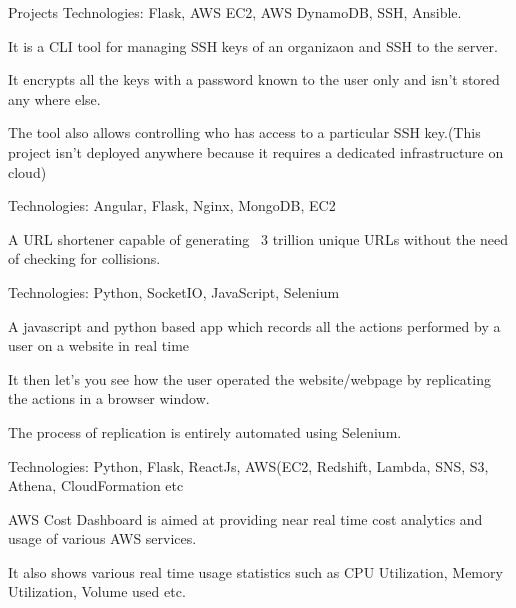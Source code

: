 \documentclass[]{resume-knyte}
\begin{document}
\begin{topic}{Projects}
    {Technologies: Flask, AWS EC2, AWS DynamoDB, SSH, Ansible.}
    {\begin{tightitemize}
        \item It is a CLI tool for managing SSH keys of an organizaon and SSH to the server.
        \item It encrypts all the keys with a password known to the user only and isn’t stored any where else.
        \item The tool also allows controlling who has access to a particular SSH key.(This project isn't deployed anywhere because it requires a dedicated infrastructure on cloud)
    \end{tightitemize}}
    {Technologies: Angular, Flask, Nginx, MongoDB, EC2}
    {\begin{tightitemize}
        \item A URL shortener capable of generating ~3 trillion unique URLs without the need of checking for collisions.
    \end{tightitemize}}
    {Technologies: Python, SocketIO, JavaScript, Selenium}
    {\begin{tightitemize}
        \item A javascript and python based app which records all the actions performed by a user on a website in real time \item It then let’s you see how the user operated the website/webpage by replicating the actions in a browser window.
        \item The process of replication is entirely automated using Selenium.
    \end{tightitemize}}
    {Technologies: Python, Flask, ReactJs, AWS(EC2, Redshift, Lambda, SNS, S3, Athena, CloudFormation etc}
    {\begin{tightitemize}
        \item AWS Cost Dashboard is aimed at providing near real time cost analytics and usage of various AWS services.
        \item It also shows various real time usage statistics such as CPU Utilization, Memory Utilization, Volume used etc.
    \end{tightitemize}}
\end{topic}
\end{document}
